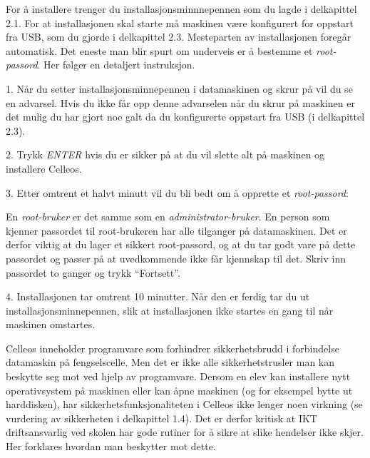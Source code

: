 For \aa{} installere trenger du installasjons\-minnnepennen som du lagde i delkapittel 2.1. For at installasjonen skal starte m\aa{} maskinen v\ae re konfigurert for oppstart fra USB, som du gjorde i delkapittel 2.3. Mesteparten av installasjonen foreg\aa r automatisk. Det eneste man blir spurt om underveis er \aa{} bestemme et {\it root-passord}. Her f\o lger en detaljert instruksjon.
\item{1.} N\aa r du setter installasjonsminnepennen i datamaskinen og skrur p\aa{} vil du se en advarsel. Hvis du ikke f\aa r opp denne advarselen n\aa r du skrur p\aa{} maskinen er det mulig du har gjort noe galt da du konfigurerte oppstart fra USB (i delkapittel 2.3).
\vskip 1pc
\vskip 1pc
\item{2.} Trykk {\it ENTER} hvis du er sikker p\aa{} at du vil slette alt p\aa{} maskinen og installere Celleos.
\item{3.} Etter omtrent et halvt minutt vil du bli bedt om \aa{} opprette et {\it root-passord}:
\vskip 1pc
\vskip 1pc
\item{} En {\it root-bruker} er det samme som en {\it administrator-bruker}. En person som kjenner passordet til root-brukeren har alle tilganger p\aa{} datamaskinen. Det er derfor viktig at du lager et sikkert root-passord, og at du tar godt vare p\aa{} dette passordet og passer p\aa{} at uvedkommende ikke f\aa r kjennskap til det. Skriv inn passordet to ganger og trykk ``Fortsett''.
\item{4.} Installasjonen tar omtrent 10 minutter. N\aa r den er ferdig tar du ut installasjonsminnepennen, slik at installasjonen ikke startes en gang til n\aa r maskinen omstartes.

\vfill\eject
\topglue 1pc

Celleos inneholder programvare som forhindrer sikkerhetsbrudd i forbindelse datamaskin p\aa{} fengselscelle. Men det er ikke alle sikkerhetstrusler man kan beskytte seg mot ved hjelp av programvare. Dersom en elev kan installere nytt operativsystem p\aa{} maskinen eller kan \aa pne maskinen (og for eksempel bytte ut harddisken), har sikkerhetsfunksjonaliteten i Celleos ikke lenger noen virkning (se vurdering av sikkerheten i delkapittel 1.4). Det er derfor kritisk at IKT driftsansvarlig ved skolen har gode rutiner for \aa{} sikre at slike hendelser ikke skjer. Her forklares hvordan man beskytter mot dette.

